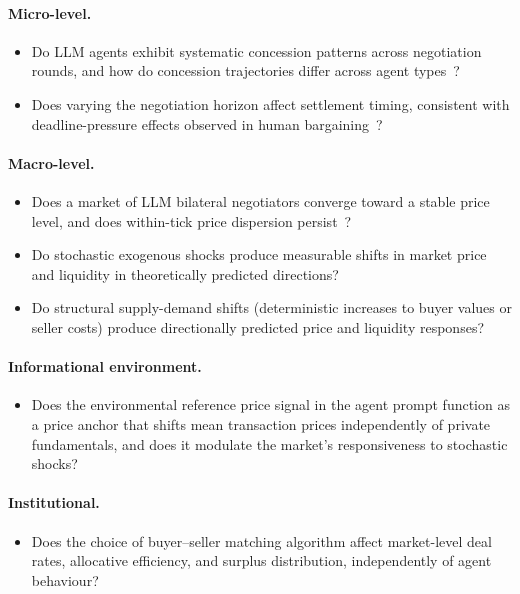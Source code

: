 \paragraph{Micro-level.}
\begin{itemize}
    \item[\textbf{RQ-A.}] Do LLM agents exhibit systematic concession patterns across negotiation rounds, and how do concession trajectories differ across agent types~\cite{rubinstein1982}?
    \item[\textbf{RQ-C.}] Does varying the negotiation horizon affect settlement timing, consistent with deadline-pressure effects observed in human bargaining~\cite{roth1988deadline}?
\end{itemize}

\paragraph{Macro-level.}
\begin{itemize}
    \item[\textbf{RQ-D.}] Does a market of LLM bilateral negotiators converge toward a stable price level, and does within-tick price dispersion persist~\cite{rubinstein1985}?
    \item[\textbf{RQ-E.}] Do stochastic exogenous shocks produce measurable shifts in market price and liquidity in theoretically predicted directions?
    \item[\textbf{RQ-I.}] Do structural supply-demand shifts (deterministic increases to buyer values or seller costs) produce directionally predicted price and liquidity responses?
\end{itemize}

\paragraph{Informational environment.}
\begin{itemize}
    \item[\textbf{RQ-J.}] Does the environmental reference price signal in the agent prompt function as a price anchor that shifts mean transaction prices independently of private fundamentals, and does it modulate the market's responsiveness to stochastic shocks?
\end{itemize}

\paragraph{Institutional.}
\begin{itemize}
    \item[\textbf{RQ-H.}] Does the choice of buyer--seller matching algorithm affect market-level deal rates, allocative efficiency, and surplus distribution, independently of agent behaviour?
\end{itemize}

